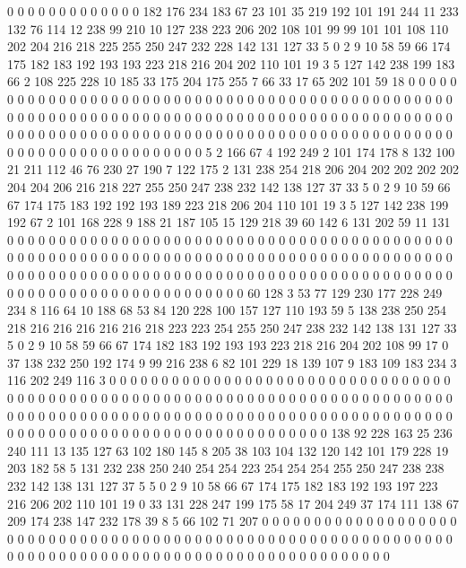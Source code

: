0 0 0 0 0 0 0 0 0 0 0 0 0 182 176 234 183 67 23 101
35 219 192 101 191 244 11 233 132 76 114 12 238 99 210 10 127 238 223 206
202 108 101 99 99 101 101 108 110 202 204 216 218 225 255 250 247 232 228 142
131 127 33 5 0 2 9 10 58 59 66 174 175 182 183 192 193 193 223 218
216 204 202 110 101 19 3 5 127 142 238 199 183 66 2 108 225 228 10 185
33 175 204 175 255 7 66 33 17 65 202 101 59 18 0 0 0 0 0 0
0 0 0 0 0 0 0 0 0 0 0 0 0 0 0 0 0 0 0 0
0 0 0 0 0 0 0 0 0 0 0 0 0 0 0 0 0 0 0 0
0 0 0 0 0 0 0 0 0 0 0 0 0 0 0 0 0 0 0 0
0 0 0 0 0 0 0 0 0 0 0 0 0 0 0 0 0 0 0 0
0 0 0 0 0 0 0 0 0 0 0 0 0 0 0 0 0 0 0 0
0 0 0 0 0 0 0 0 0 0 0 0 0 0 0 0 0 0 0 0
0 0 0 0 0 0 0 0 0 0 0 0 0 0 0 0 0 0 0 0
0 0 0 0 0 0 0 5 2 166 67 4 192 249 2 101 174 178 8 132
100 21 211 112 46 76 230 27 190 7 122 175 2 131 238 254 218 206 204 202
202 202 202 204 204 206 216 218 227 255 250 247 238 232 142 138 127 37 33 5
0 2 9 10 59 66 67 174 175 183 192 192 193 189 223 218 206 204 110 101
19 3 5 127 142 238 199 192 67 2 101 168 228 9 188 21 187 105 15 129
218 39 60 142 6 131 202 59 11 131 0 0 0 0 0 0 0 0 0 0
0 0 0 0 0 0 0 0 0 0 0 0 0 0 0 0 0 0 0 0
0 0 0 0 0 0 0 0 0 0 0 0 0 0 0 0 0 0 0 0
0 0 0 0 0 0 0 0 0 0 0 0 0 0 0 0 0 0 0 0
0 0 0 0 0 0 0 0 0 0 0 0 0 0 0 0 0 0 0 0
0 0 0 0 0 0 0 0 0 0 0 0 0 0 0 0 0 0 0 0
0 0 0 0 0 0 0 0 0 0 0 0 0 0 0 0 0 0 0 0
0 0 0 0 0 0 0 0 0 0 0 0 0 0 0 0 0 0 0 0
0 0 60 128 3 53 77 129 230 177 228 249 234 8 116 64 10 188 68 53
84 120 228 100 157 127 110 193 59 5 138 238 250 254 218 216 216 216 216 216
218 223 223 254 255 250 247 238 232 142 138 131 127 33 5 0 2 9 10 58
59 66 67 174 182 183 192 193 193 223 218 216 204 202 108 99 17 0 37 138
232 250 192 174 9 99 216 238 6 82 101 229 18 139 107 9 183 109 183 234
3 116 202 249 116 3 0 0 0 0 0 0 0 0 0 0 0 0 0 0
0 0 0 0 0 0 0 0 0 0 0 0 0 0 0 0 0 0 0 0
0 0 0 0 0 0 0 0 0 0 0 0 0 0 0 0 0 0 0 0
0 0 0 0 0 0 0 0 0 0 0 0 0 0 0 0 0 0 0 0
0 0 0 0 0 0 0 0 0 0 0 0 0 0 0 0 0 0 0 0
0 0 0 0 0 0 0 0 0 0 0 0 0 0 0 0 0 0 0 0
0 0 0 0 0 0 0 0 0 0 0 0 0 0 0 0 0 0 0 0
0 0 0 0 0 0 0 0 0 0 0 0 0 0 0 0 138 92 228 163
25 236 240 111 13 135 127 63 102 180 145 8 205 38 103 104 132 120 142 101
179 228 19 203 182 58 5 131 232 238 250 240 254 254 223 254 254 254 255 250
247 238 238 232 142 138 131 127 37 5 5 0 2 9 10 58 66 67 174 175
182 183 192 193 197 223 216 206 202 110 101 19 0 33 131 228 247 199 175 58
17 204 249 37 174 111 138 67 209 174 238 147 232 178 39 8 5 66 102 71
207 0 0 0 0 0 0 0 0 0 0 0 0 0 0 0 0 0 0 0
0 0 0 0 0 0 0 0 0 0 0 0 0 0 0 0 0 0 0 0
0 0 0 0 0 0 0 0 0 0 0 0 0 0 0 0 0 0 0 0
0 0 0 0 0 0 0 0 0 0 0 0 0 0 0 0 0 0 0 0
0 0 0 0 0 0 0 0 0 0 0 0 0 0 0 0 0 0 0 0
